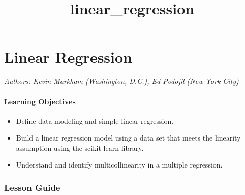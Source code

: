\documentclass[11pt]{article}
\title{linear\_regression}
\providecommand{\tightlist}{%
      \setlength{\itemsep}{0pt}\setlength{\parskip}{0pt}}
\begin{document}
    
    
    \maketitle
    
    

    
    \section{Linear Regression}\label{linear-regression}

\emph{Authors: Kevin Markham (Washington, D.C.), Ed Podojil (New York
City)}

    \paragraph{Learning Objectives}\label{learning-objectives}

\begin{itemize}
\tightlist
\item
  Define data modeling and simple linear regression.
\item
  Build a linear regression model using a data set that meets the
  linearity assumption using the scikit-learn library.
\item
  Understand and identify multicollinearity in a multiple regression.
\end{itemize}

    \subsubsection{Lesson Guide}\label{lesson-guide}
\end{document}
